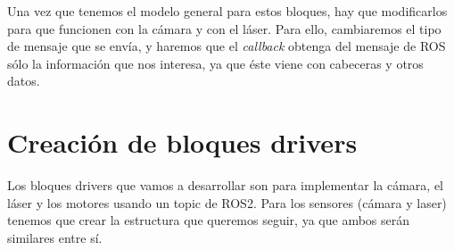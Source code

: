 Una vez que tenemos el modelo general para estos bloques, hay que modificarlos para que funcionen con la cámara y con el láser. Para ello,
cambiaremos el tipo de mensaje que se envía, y haremos que el \textit{callback} obtenga del mensaje de ROS sólo la información que nos interesa,
ya que éste viene con cabeceras y otros datos.\\











































\section{Creación de bloques drivers}
\label{sec:drivers_creacion}

Los bloques drivers que vamos a desarrollar son para implementar la cámara, el láser y los motores usando un topic de ROS2.
Para los sensores (cámara y laser) tenemos que crear la estructura que queremos seguir, ya que ambos serán similares entre sí.\\

